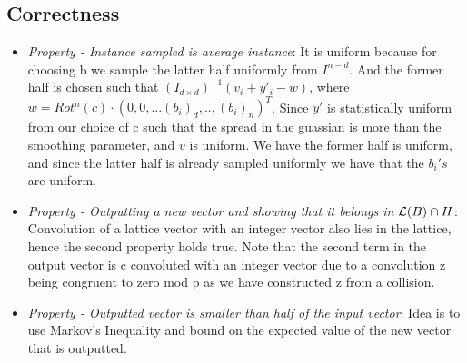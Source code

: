 \subsection{Correctness}
\begin{itemize}
\item \textit{Property - Instance sampled is average instance}: It is uniform because for choosing b we sample the latter half uniformly from $I^{n-d}$. And the former half is chosen such that ${(I_{d \times d})}^{-1}(v_i + y'_i - w)$, where $w = Rot^n(c) \cdot {(0,0,...(b_i)_d,..,(b_i)_n)}^T$. Since $y'$ is statistically uniform from our choice of c such that the spread in the guassian is more than the smoothing parameter, and $v$ is uniform. We have the former half is uniform, and since the latter half is already sampled uniformly we have that the $b_i's$ are uniform.
\item \textit{Property - Outputting a new vector and showing that it belongs in $\mathcal{L}(B) \cap H$}: Convolution of a lattice vector with an integer vector also lies in the lattice, hence the second property holds true. Note that the second term in the output vector is c convoluted with an integer vector due to a convolution z being congruent to zero mod p as we have constructed z from a collision.
\item \textit{Property - Outputted vector is smaller than half of the input vector}: Idea is to use Markov's Inequality and bound on the expected value of the new vector that is outputted.
\end{itemize}